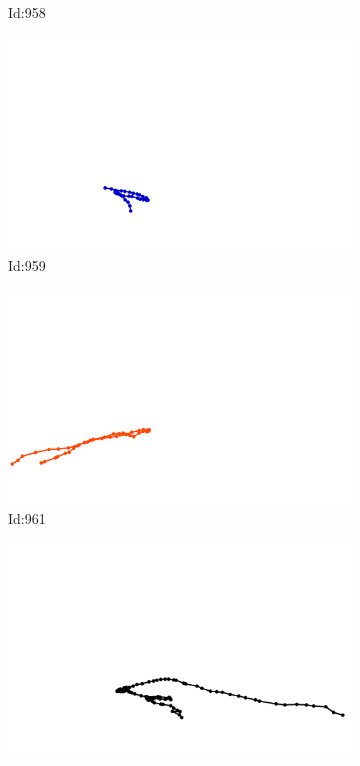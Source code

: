 \documentclass[12pt,twoside]{report}
\begin{document}
\begin{figure}
\begin{subfigure}[b]{0.20\textwidth}
\caption{Id:958}
\end{subfigure}
\begin{subfigure}[b]{0.20\textwidth}
\centering
\includegraphics[width=\textwidth]{../trajectories/959.png}
\caption{Id:959}
\end{subfigure}
\begin{subfigure}[b]{0.20\textwidth}
\centering
\includegraphics[width=\textwidth]{../trajectories/961.png}
\caption{Id:961}
\end{subfigure}
\begin{subfigure}[b]{0.20\textwidth}
\centering
\includegraphics[width=\textwidth]{../trajectories/969.png}

\end{subfigure}
\end{figure}
\end{document}

